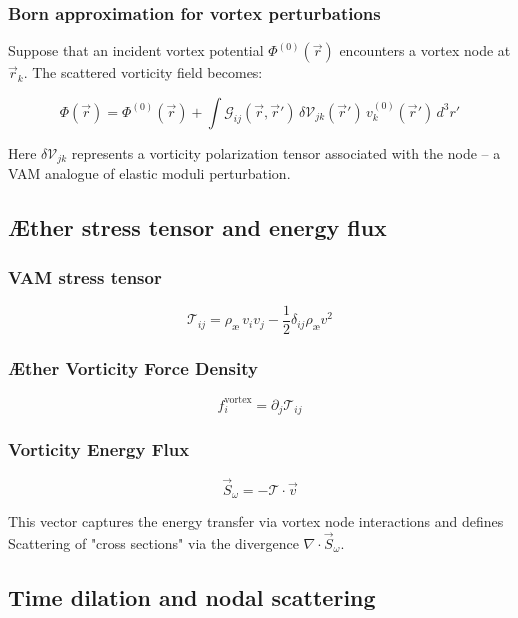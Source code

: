 \documentclass[preprint]{revtex4-2}
\begin{document}
\subsubsection*{Born approximation for vortex perturbations}

Suppose that an incident vortex potential \(\Phi^{(0)}(\vec{r})\) encounters a vortex node at \(\vec{r}_k\). The scattered vorticity field becomes:

\[
    \Phi(\vec{r}) = \Phi^{(0)}(\vec{r}) + \int \mathcal{G}_{ij}(\vec{r}, \vec{r}') \, \delta \mathcal{V}_{jk}(\vec{r}') \, v_k^{(0)}(\vec{r}') \, d^3r'
\]

Here \(\delta \mathcal{V}_{jk}\) represents a vorticity polarization tensor associated with the node – a VAM analogue of elastic moduli perturbation.

\subsection{Æther stress tensor and energy flux}

\subsubsection*{VAM stress tensor}

\[
    \mathcal{T}_{ij} = \rho_\text{\ae} \, v_i v_j - \frac{1}{2} \delta_{ij} \rho_\text{\ae} v^2
\]

\subsubsection*{Æther Vorticity Force Density}

\[
    f_i^\text{vortex} = \partial_j \mathcal{T}_{ij}
\]

\subsubsection*{Vorticity Energy Flux}

\[
    \vec{S}_\omega = - \mathcal{T} \cdot \vec{v}
\]

This vector captures the energy transfer via vortex node interactions and defines Scattering of "cross sections" via the divergence \(\nabla \cdot \vec{S}_\omega\).

\subsection{Time dilation and nodal scattering}
\end{document}
